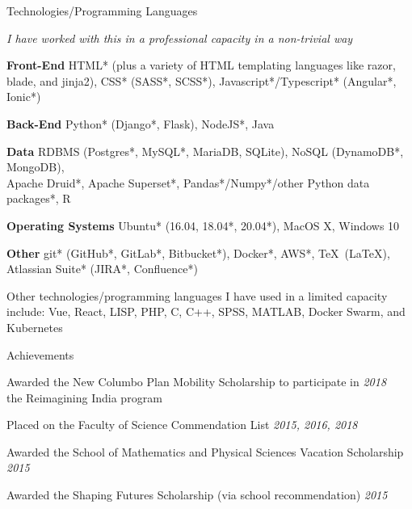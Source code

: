 \documentclass{resume} %
\begin{document}
\begin{rSection}{Technologies/Programming Languages}
    \item {\em * I have worked with this in a professional capacity in a non-trivial way}
    \item {\bf Front-End} HTML* (plus a variety of HTML templating languages like razor, blade, and jinja2), CSS* (SASS*, SCSS*), Javascript*/Typescript* (Angular*, Ionic*)
    \item {\bf Back-End} Python* (Django*, Flask), NodeJS*, Java
    \item {\bf Data} RDBMS (Postgres*, MySQL*, MariaDB, SQLite), NoSQL (DynamoDB*, MongoDB), \\ Apache Druid*, Apache Superset*, Pandas*/Numpy*/other Python data packages*, R
    \item {\bf Operating Systems} Ubuntu* (16.04, 18.04*, 20.04*), MacOS X, Windows 10
    \item {\bf Other} git* (GitHub*, GitLab*, Bitbucket*), Docker*, AWS*, \TeX\ (\LaTeX), Atlassian Suite* (JIRA*, Confluence*)
    \item Other technologies/programming languages I have used in a limited capacity include: Vue, React, LISP, PHP, C, C++, SPSS, MATLAB, Docker Swarm, and Kubernetes
\end{rSection}

\begin{rSection}{Achievements}
    \item Awarded the New Columbo Plan Mobility Scholarship to participate in \hfill {\em 2018} \\ the Reimagining India program
    \item Placed on the Faculty of Science Commendation List \hfill {\em 2015, 2016, 2018}
    \item Awarded the School of Mathematics and Physical Sciences Vacation Scholarship \hfill {\em 2015}
    \item Awarded the Shaping Futures Scholarship (via school recommendation) \hfill {\em 2015} \
\end{rSection}
\end{document}
